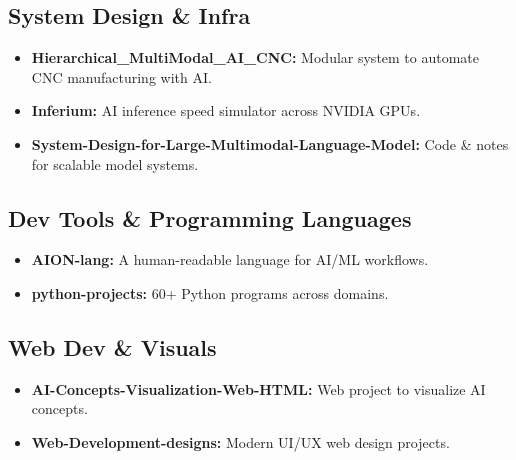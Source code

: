\documentclass[11pt,a4paper]{article}
\begin{document}
\subsection{System Design \& Infra}
\begin{itemize}
    \item \textbf{Hierarchical\_MultiModal\_AI\_CNC:} Modular system to automate CNC manufacturing with AI.
    \item \textbf{Inferium:} AI inference speed simulator across NVIDIA GPUs.
    \item \textbf{System-Design-for-Large-Multimodal-Language-Model:} Code \& notes for scalable model systems.
\end{itemize}

\subsection{Dev Tools \& Programming Languages}
\begin{itemize}
    \item \textbf{AION-lang:} A human-readable language for AI/ML workflows.
    \item \textbf{python-projects:} 60+ Python programs across domains.
\end{itemize}

\subsection{Web Dev \& Visuals}
\begin{itemize}
    \item \textbf{AI-Concepts-Visualization-Web-HTML:} Web project to visualize AI concepts.
    \item \textbf{Web-Development-designs:} Modern UI/UX web design projects.
\end{itemize}
\end{document}
